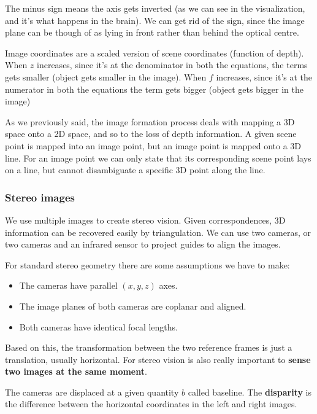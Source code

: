 The minus sign means the axis gets inverted (as we can see in the visualization, and it's what happens in the brain).
We can get rid of the sign, since the image plane can be though of as lying in front rather than behind the optical centre.

Image coordinates are a scaled version of scene coordinates (function of depth).
When $z$ increases, since it's at the denominator in both the equations, the terms gets smaller (object gets smaller in the image).
When $f$ increases, since it's at the numerator in both the equations the term gets bigger (object gets bigger in the image)

As we previously said, the image formation process deals with mapping a 3D space onto a 2D space, and so to the loss of depth information.
A given scene point is mapped into an image point, but an image point is mapped onto a 3D line.
For an image point we can only state that its corresponding scene point lays on a line, but cannot disambiguate a specific 3D point along the line.

\subsubsection{Stereo images}

We use multiple images to create stereo vision.
Given correspondences, 3D information can be recovered easily by triangulation.
We can use two cameras, or two cameras and an infrared sensor to project guides to align the images.

For standard stereo geometry there are some assumptions we have to make:
\begin{itemize}
  \item The cameras have parallel $(x,y,z)$ axes.
  \item The image planes of both cameras are coplanar and aligned.
  \item Both cameras have identical focal lengths.
\end{itemize}
\vspace{1em}
Based on this, the transformation between the two reference frames is just a translation, usually horizontal.
For stereo vision is also really important to \textbf{sense two images at the same moment}.

The cameras are displaced at a given quantity $b$ called baseline.
The \textbf{disparity} is the difference between the horizontal coordinates in the left and right images.

